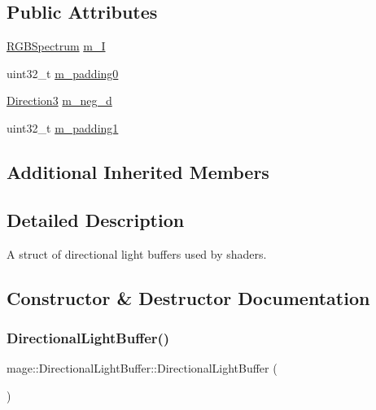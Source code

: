 \subsection*{Public Attributes}
\begin{DoxyCompactItemize}
\item 
\hyperlink{structmage_1_1_r_g_b_spectrum}{R\+G\+B\+Spectrum} \hyperlink{structmage_1_1_directional_light_buffer_a357b86deb8ed2926cb77ed8191e967e6}{m\+\_\+I}
\item 
uint32\+\_\+t \hyperlink{structmage_1_1_directional_light_buffer_af2e82dd3f47a965e009db19da9fb5167}{m\+\_\+padding0}
\item 
\hyperlink{structmage_1_1_direction3}{Direction3} \hyperlink{structmage_1_1_directional_light_buffer_af3a1952cf82b66730868573a4b581ab4}{m\+\_\+neg\+\_\+d}
\item 
uint32\+\_\+t \hyperlink{structmage_1_1_directional_light_buffer_a81074641afb7ae296f7c6ee1b3fb12a2}{m\+\_\+padding1}
\end{DoxyCompactItemize}
\subsection*{Additional Inherited Members}


\subsection{Detailed Description}
A struct of directional light buffers used by shaders. 

\subsection{Constructor \& Destructor Documentation}
\hypertarget{structmage_1_1_directional_light_buffer_a73a87ba7b016b6c62375da62b4fdf7b6}{}\label{structmage_1_1_directional_light_buffer_a73a87ba7b016b6c62375da62b4fdf7b6} 
\subsubsection{\texorpdfstring{Directional\+Light\+Buffer()}{DirectionalLightBuffer()}\hspace{0.1cm}{\footnotesize\ttfamily [1/3]}}
{\footnotesize\ttfamily mage\+::\+Directional\+Light\+Buffer\+::\+Directional\+Light\+Buffer (\begin{DoxyParamCaption}{ }\end{DoxyParamCaption})}

